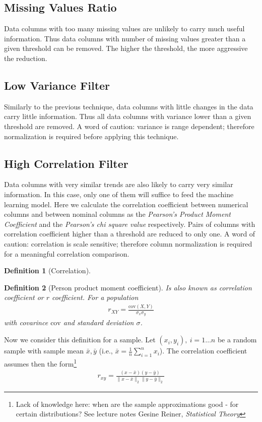\documentclass[10pt,a4paper]{article}
\newtheorem{definition}{Definition}
\begin{document}
\subsection*{Missing Values Ratio}
Data columns with too many missing values are unlikely to carry much useful information. Thus data columns with number of missing values greater than a given threshold can be removed. The higher the threshold, the more aggressive the reduction.
\subsection*{Low Variance Filter}
Similarly to the previous technique, data columns with little changes in the data carry little information. Thus all data columns with variance lower than a given threshold are removed. A word of caution: variance is range dependent; therefore normalization is required before applying this technique.

\subsection*{High Correlation Filter}
Data columns with very similar trends are also likely to carry very similar information. In this case, only one of them will suffice to feed the machine learning model. Here we calculate the correlation coefficient between numerical columns and between nominal columns as the \textit{Pearson’s Product Moment Coefficient} and the \textit{Pearson's chi square value} respectively. Pairs of columns with correlation coefficient higher than a threshold are reduced to only one. A word of caution: correlation is scale sensitive; therefore column normalization is required for a meaningful correlation comparison.

\begin{definition}[Correlation]
\end{definition}


\begin{definition}[Person product moment coefficient] Is also known as correlation coefficient or $r$ coefficient. For a population
\begin{align}
r_{XY} = \frac{\text{cov}(X,Y)}{\sigma_x \sigma_y}
\end{align}
with covarince $\text{cov}$ and standard deviation $\sigma$.
\end{definition}
Now we consider this definition for a sample. Let $(x_i, y_i), ~ i = 1 \dots n$  be a random sample  with sample mean $\bar x, \bar y$  (i.e., $\bar x = \frac{1}{n} \sum_{i=1}^n x_i$). The correlation coefficient assumes then the form\footnote{Lack of knowledge here: when are the sample approximations good - for certain distributions? See lecture notes Gesine Reiner, \textit{Statistical Theory}}
\begin{align}
r_{xy} = \frac{\left(x-\bar x\right)\left(y-\bar y\right)}{\lVert x-\bar x \rVert_2 \lVert y-\bar y \rVert_2}
\end{align}
\end{document}
